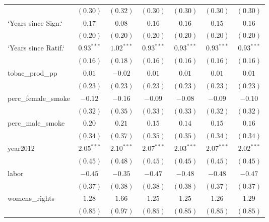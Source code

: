 \begin{table}[!h]
\begin{center}
\begin{tabular}{l c c c c c c }
                        & $(0.30)$     & $(0.32)$     & $(0.30)$     & $(0.30)$     & $(0.30)$     & $(0.30)$     \\
`Years since Sign.`     & $0.17$       & $0.08$       & $0.16$       & $0.16$       & $0.15$       & $0.16$       \\
                        & $(0.20)$     & $(0.20)$     & $(0.20)$     & $(0.20)$     & $(0.20)$     & $(0.20)$     \\
`Years since Ratif.`    & $0.93^{***}$ & $1.02^{***}$ & $0.93^{***}$ & $0.93^{***}$ & $0.93^{***}$ & $0.93^{***}$ \\
                        & $(0.16)$     & $(0.18)$     & $(0.16)$     & $(0.16)$     & $(0.16)$     & $(0.16)$     \\
tobac\_prod\_pp         & $0.01$       & $-0.02$      & $0.01$       & $0.01$       & $0.01$       & $0.01$       \\
                        & $(0.23)$     & $(0.23)$     & $(0.23)$     & $(0.23)$     & $(0.23)$     & $(0.23)$     \\
perc\_female\_smoke     & $-0.12$      & $-0.16$      & $-0.09$      & $-0.08$      & $-0.09$      & $-0.10$      \\
                        & $(0.32)$     & $(0.35)$     & $(0.33)$     & $(0.33)$     & $(0.32)$     & $(0.32)$     \\
perc\_male\_smoke       & $0.20$       & $0.21$       & $0.15$       & $0.14$       & $0.15$       & $0.16$       \\
                        & $(0.34)$     & $(0.37)$     & $(0.35)$     & $(0.35)$     & $(0.34)$     & $(0.34)$     \\
year2012                & $2.05^{***}$ & $2.10^{***}$ & $2.07^{***}$ & $2.03^{***}$ & $2.07^{***}$ & $2.02^{***}$ \\
                        & $(0.45)$     & $(0.48)$     & $(0.45)$     & $(0.45)$     & $(0.45)$     & $(0.45)$     \\
labor                   & $-0.45$      & $-0.35$      & $-0.47$      & $-0.48$      & $-0.48$      & $-0.47$      \\
                        & $(0.37)$     & $(0.38)$     & $(0.38)$     & $(0.38)$     & $(0.37)$     & $(0.37)$     \\
womens\_rights          & $1.28$       & $1.66$       & $1.25$       & $1.25$       & $1.26$       & $1.29$       \\
                        & $(0.85)$     & $(0.97)$     & $(0.85)$     & $(0.85)$     & $(0.85)$     & $(0.85)$     \\

\end{tabular}
\end{center}
\end{table}
